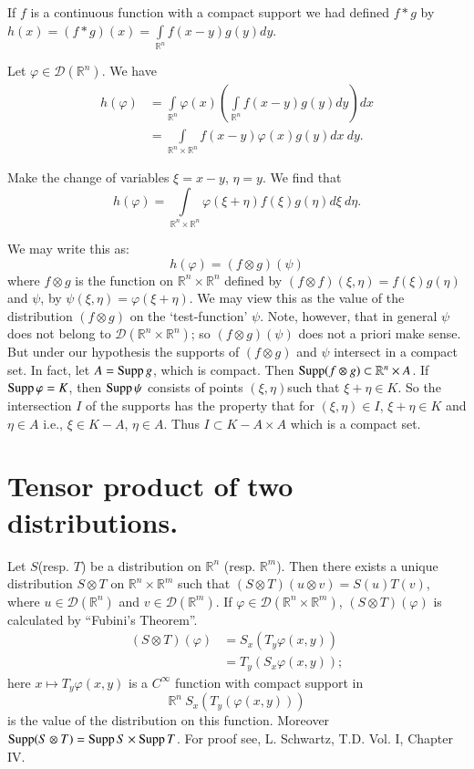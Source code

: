 If $f$ is a continuous function with a compact support we had defined $f\ast g$ by $h(x)=(f\ast g)(x)=\int\limits_{\mathbb{R}^{n}}f(x-y)g(y)dy$.

Let $\varphi\in \mathcal{D}(\mathbb{R}^{n})$. We have
\begin{align*}
h(\varphi) &= \int\limits_{\mathbb{R}^{n}}\varphi(x)\left(\int\limits_{\mathbb{R}^{n}}f(x-y)g(y)dy\right)dx\\[3pt]
&= \int\limits_{\mathbb{R}^{n}\times \mathbb{R}^{n}}f(x-y)\varphi(x)g(y)dx \ dy.
\end{align*}

Make the change of variables $\xi=x-y$, $\eta=y$. We find that
$$
h(\varphi)=\int\limits_{\mathbb{R}^{n}\times \mathbb{R}^{n}}\varphi(\xi+\eta)f(\xi)g(\eta)d\xi \ d\eta.
$$

We may write this as:
$$
h(\varphi)=(f\otimes g)(\psi)
$$
where $f\otimes g$ is the function on $\mathbb{R}^{n}\times \mathbb{R}^{n}$ defined by $(f\otimes f)(\xi,\eta)=f(\xi)g(\eta)$ and $\psi$, by $\psi(\xi,\eta)=\varphi(\xi+\eta)$. We may view this as the value of the distribution $(f\otimes g)$ on the `test-function' $\psi$. Note, however, that in general $\psi$ does not belong to $\mathcal{D}(\mathbb{R}^{n}\times \mathbb{R}^{n})$; so $(f\otimes g)(\psi)$ does not a priori make sense. But under our hypothesis the supports of $(f\otimes g)$ and $\psi$ intersect in a compact set. In fact, let $A=\operatorname{Supp} g$, which is compact. Then $\operatorname{Supp} (f\otimes g)\subset \mathbb{R}^{n}\times A$. If $\operatorname{Supp} \varphi=K$, then $\operatorname{Supp} \psi$ consists of points $(\xi,\eta)$\pageoriginale such that $\xi+\eta\in K$. So the intersection $I$ of the supports has the property that for $(\xi,\eta)\in I$, $\xi+\eta \in K$ and $\eta\in A$ i.e., $\xi \in K-A$, $\eta\in A$. Thus $I\subset K-A\times A$ which is a compact set.

\section*{Tensor product of two distributions.}

Let $S$(resp. $T$) be a distribution on $\mathbb{R}^{n}$ (resp. $\mathbb{R}^{m}$). Then there exists a unique distribution $S\otimes T$ on $\mathbb{R}^{n}\times \mathbb{R}^{m}$ such that $(S\otimes T)(u\otimes v)=S(u)T(v)$, where $u\in \mathcal{D}(\mathbb{R}^{n})$ and $v\in \mathcal{D}(\mathbb{R}^{m})$. If $\varphi\in \mathcal{D}(\mathbb{R}^{n}\times \mathbb{R}^{m})$, $(S\otimes T)(\varphi)$ is calculated by ``Fubini's Theorem''.
\begin{align*}
(S\otimes T) (\varphi) &= S_{x}(T_{y}\varphi (x,y))\\[3pt]
&= T_{y}(S_{x}\varphi(x,y));
\end{align*}
here $x\mapsto T_{y}\varphi(x,y)$ is a $C^{\infty}$ function with compact support in 
$$
\mathbb{R}^{n} \ S_{x}(T_{y}(\varphi(x,y)))
$$
is the value of the distribution on this function. Moreover $\operatorname{Supp} (S\otimes T)=\operatorname{Supp} S\times \operatorname{Supp} T$. For proof see, L. Schwartz, T.D. Vol. I, Chapter IV.

